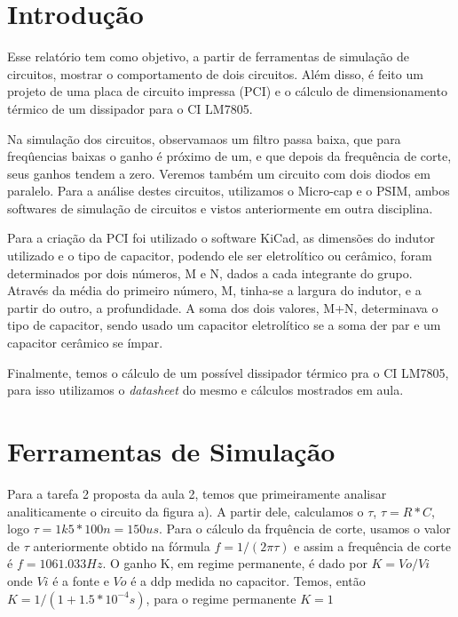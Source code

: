 \chapter*{Introdução}

Esse relatório tem como objetivo, a partir de ferramentas de simulação de circuitos, mostrar o comportamento de dois circuitos. Além disso, é feito um projeto de uma placa de circuito impressa (PCI) e o cálculo de dimensionamento térmico de um dissipador para o CI LM7805. 

Na simulação dos circuitos, observamaos um filtro passa baixa, que para freqûencias baixas o ganho é próximo de um, e que depois da frequência de corte, seus ganhos tendem a zero. Veremos também um circuito com dois diodos em paralelo. Para a análise destes circuitos, utilizamos o Micro-cap e o PSIM, ambos softwares de simulação de circuitos e vistos anteriormente em outra disciplina.

Para a criação da PCI foi utilizado o software KiCad, as dimensões do indutor utilizado e o tipo de capacitor, podendo ele ser eletrolítico ou cerâmico, foram determinados por dois números, M e N, dados a cada integrante do grupo. Através da média do primeiro número, M, tinha-se a largura do indutor, e a partir do outro, a profundidade. A soma dos dois valores, M+N, determinava o tipo de capacitor, sendo usado um capacitor eletrolítico se a soma der par e um capacitor cerâmico se ímpar.

Finalmente, temos o cálculo de um possível dissipador térmico pra o CI LM7805, para isso utilizamos o \textit{datasheet}\cite{datasheet} do mesmo e cálculos mostrados em aula. 

\chapter{Ferramentas de Simulação}\label{cap_simul}
    Para a tarefa 2 proposta da aula 2, temos que primeiramente analisar analiticamente o circuito da figura a). A partir dele, calculamos o $\tau$, $\tau = R*C $, logo $\tau = 1k5 * 100n = 150us$. Para o cálculo da frquência de corte, usamos o valor de $\tau$ anteriormente obtido na fórmula $f = 1/(2\pi\tau)$ e assim a frequência de corte é $f = 1061.033 Hz$. O ganho K, em regime permanente, é dado por $K = Vo/Vi$ onde $Vi$ é a fonte e $Vo$ é a ddp medida no capacitor. Temos, então $K = 1/(1 + 1.5*10^{-4}s)$, para o regime permanente $K = 1$
    
